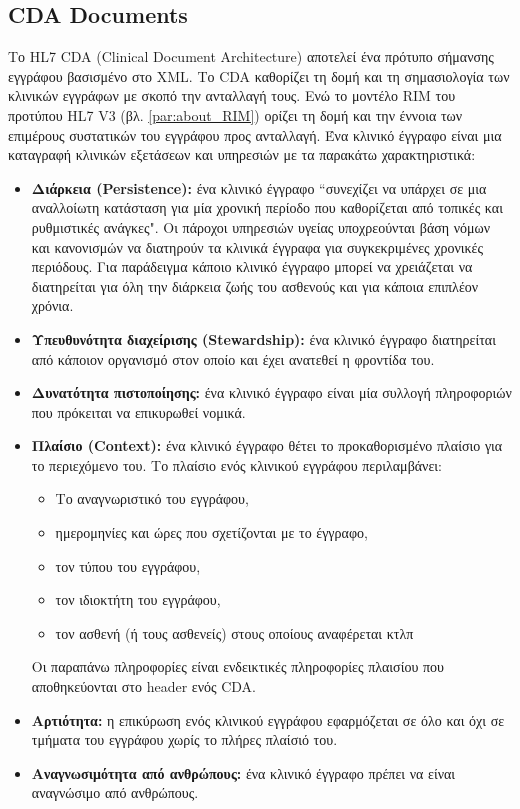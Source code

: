 	\subsection{CDA Documents}
	Το HL7 CDA (Clinical Document Architecture) αποτελεί ένα πρότυπο σήμανσης εγγράφου βασισμένο στο XML. Το CDA καθορίζει τη δομή και τη σημασιολογία των κλινικών εγγράφων με σκοπό την ανταλλαγή τους\cite{boone2011cda}. Ενώ το μοντέλο RIM του προτύπου HL7 V3 (βλ. \ref{par:about_RIM}) ορίζει τη δομή και την έννοια των επιμέρους συστατικών του εγγράφου προς ανταλλαγή. Ένα κλινικό έγγραφο είναι μια καταγραφή κλινικών εξετάσεων και υπηρεσιών με τα παρακάτω χαρακτηριστικά\cite{boone2011cda}:
	\begin{itemize}
		\item \textbf{Διάρκεια (Persistence): } ένα κλινικό έγγραφο ``συνεχίζει να υπάρχει σε μια αναλλοίωτη κατάσταση για μία χρονική περίοδο που καθορίζεται από τοπικές και ρυθμιστικές ανάγκες"\cite{dolin2001hl7}. Οι πάροχοι υπηρεσιών υγείας υποχρεούνται βάση νόμων και κανονισμών να διατηρούν τα κλινικά έγγραφα για συγκεκριμένες χρονικές περιόδους. Για παράδειγμα κάποιο κλινικό έγγραφο μπορεί να χρειάζεται να διατηρείται για όλη την διάρκεια ζωής του ασθενούς και για κάποια επιπλέον χρόνια.
		\item \textbf{Υπευθυνότητα διαχείρισης (Stewardship): } ένα κλινικό έγγραφο διατηρείται από κάποιον οργανισμό στον οποίο και έχει ανατεθεί η φροντίδα του.
		\item \textbf{Δυνατότητα πιστοποίησης: } ένα κλινικό έγγραφο είναι μία συλλογή πληροφοριών που πρόκειται να επικυρωθεί νομικά. 
		\item \textbf{Πλαίσιο (Context): } ένα κλινικό έγγραφο θέτει το προκαθορισμένο πλαίσιο για το περιεχόμενο του. Το πλαίσιο ενός κλινικού εγγράφου περιλαμβάνει:
		\begin{itemize}
			\item Το αναγνωριστικό του εγγράφου,
			\item ημερομηνίες και ώρες που σχετίζονται με το έγγραφο,
			\item τον τύπου του εγγράφου,
			\item τον ιδιοκτήτη του εγγράφου,
			\item τον ασθενή (ή τους ασθενείς) στους οποίους αναφέρεται κτλπ
		\end{itemize}
		Οι παραπάνω πληροφορίες είναι ενδεικτικές πληροφορίες πλαισίου που αποθηκεύονται στο header ενός CDA.
		\item \textbf{Αρτιότητα: } η επικύρωση ενός κλινικού εγγράφου εφαρμόζεται σε όλο και όχι σε τμήματα του εγγράφου χωρίς το πλήρες  πλαίσιό του.
		\item \textbf{Αναγνωσιμότητα από ανθρώπους: } ένα κλινικό έγγραφο πρέπει να είναι αναγνώσιμο από ανθρώπους.
	\end{itemize}
	
